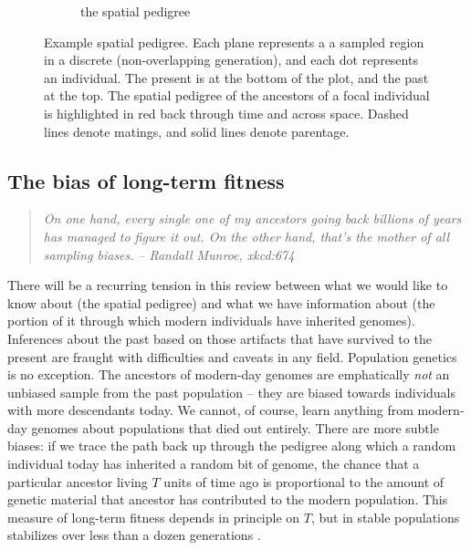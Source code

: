 \documentclass{ar-1col}
\newcommand{\plr}[1]{{\color{green}{#1}}}
\begin{document}
\begin{figure}[ht]
\begin{subfigure}{0.5\textwidth}
        \caption{the spatial pedigree}
        \label{sp_pedigree}
    \end{subfigure}
        \caption{
            Example spatial pedigree.
                    Each plane represents a a sampled region in a discrete (non-overlapping generation),
                    and each dot represents an individual.
                    The present is at the bottom of the plot, and the past at the top.
                    The spatial pedigree of the ancestors of a focal individual is highlighted in red
                    back through time and across space.
                    Dashed lines denote matings, and solid lines denote parentage.
        }
        \label{spatial_pedigree}
\end{figure}

\subsection{The bias of long-term fitness}


\begin{quote}
    \textit{
    On one hand, every single one of my ancestors going back billions of years
    has managed to figure it out.
    On the other hand, that's the mother of all sampling biases.}
    \hfill \emph{-- Randall Munroe, xkcd:674}
\end{quote}

There will be a recurring tension in this review
between what we would like to know about (the spatial pedigree)
and what we have information about 
(the portion of it through which modern individuals have inherited genomes).
Inferences about the past
based on those artifacts that have survived to the present
are fraught with difficulties and caveats in any field.
Population genetics is no exception.
The ancestors of modern-day genomes are emphatically \emph{not} an unbiased sample
from the past population -- 
they are biased towards individuals with more descendants today.
We cannot, of course, learn anything from modern-day genomes
about populations that died out entirely.
There are more subtle biases:
if we trace the path back up through the pedigree 
along which a random individual today has inherited a random bit of genome,
the chance that a particular ancestor living $T$ units of time ago
is proportional to the amount of genetic material that ancestor has contributed to the modern population.
This measure of long-term fitness depends in principle on $T$,
but in stable populations stabilizes over less than a dozen generations \citep{barton_etheridge_fitness} \plr{check that!}.
\end{document}

